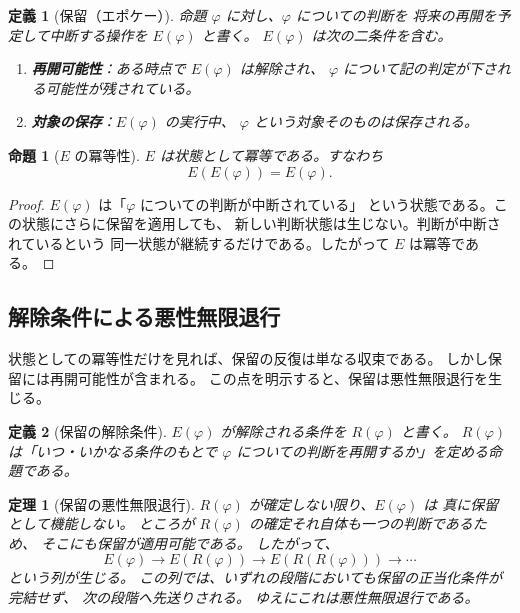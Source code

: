 \documentclass[11pt,a4paper,ja=standard,lualatex]{article}
\newtheorem{theorem}{定理}
\newtheorem{definition}{定義}
\newtheorem{proposition}{命題}
\begin{document}
\begin{definition}[保留（エポケー）]
命題 $\varphi$ に対し、$\varphi$ についての判断を
将来の再開を予定して中断する操作を $E(\varphi)$ と書く。
$E(\varphi)$ は次の二条件を含む。

\begin{enumerate}
\item \textbf{再開可能性}：ある時点で $E(\varphi)$ は解除され、
  $\varphi$ について記の判定が下される可能性が残されている。
\item \textbf{対象の保存}：$E(\varphi)$ の実行中、
  $\varphi$ という対象そのものは保存される。
\end{enumerate}
\end{definition}

\begin{proposition}[$E$ の冪等性]
$E$ は状態として冪等である。すなわち
\begin{equation}
E(E(\varphi))=E(\varphi).
\end{equation}
\end{proposition}

\begin{proof}
$E(\varphi)$ は「$\varphi$ についての判断が中断されている」
という状態である。この状態にさらに保留を適用しても、
新しい判断状態は生じない。判断が中断されているという
同一状態が継続するだけである。したがって $E$ は冪等である。
\end{proof}

\subsection{解除条件による悪性無限退行}

状態としての冪等性だけを見れば、保留の反復は単なる収束である。
しかし保留には再開可能性が含まれる。
この点を明示すると、保留は悪性無限退行を生じる。

\begin{definition}[保留の解除条件]
$E(\varphi)$ が解除される条件を $R(\varphi)$ と書く。
$R(\varphi)$ は「いつ・いかなる条件のもとで
$\varphi$ についての判断を再開するか」を定める命題である。
\end{definition}

\begin{theorem}[保留の悪性無限退行]
$R(\varphi)$ が確定しない限り、$E(\varphi)$ は
真に保留として機能しない。
ところが $R(\varphi)$ の確定それ自体も一つの判断であるため、
そこにも保留が適用可能である。
したがって、
\begin{equation}
E(\varphi)\longrightarrow E(R(\varphi))
\longrightarrow E(R(R(\varphi)))
\longrightarrow\cdots
\end{equation}
という列が生じる。
この列では、いずれの段階においても保留の正当化条件が完結せず、
次の段階へ先送りされる。
ゆえにこれは悪性無限退行である。
\end{theorem}
\end{document}
